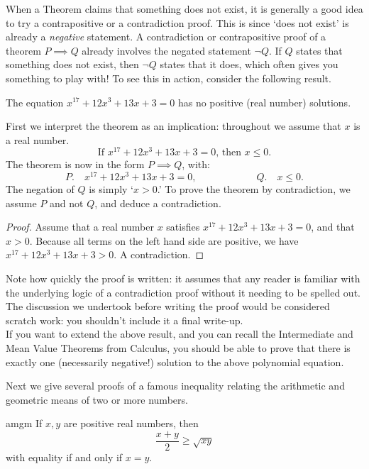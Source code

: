 
When a Theorem claims that something does not exist, it is generally a good idea to try a contrapositive or a contradiction proof. This is since `does not exist' is already a \emph{negative} statement. A contradiction or contrapositive proof of a theorem $P\implies Q$ already involves the negated statement $\neg Q$. If $Q$ states that something does not exist, then $\neg Q$ states that it does, which often gives you something to play with! To see this in action, consider the following result.

\begin{thm}{}{}
The equation $x^{17}+12x^3+13x+3=0$ has no positive (real number) solutions.
\end{thm}

 First we interpret the theorem as an implication: throughout we assume that $x$ is a real number.
\[\text{If $x^{17}+12x^3+13x+3=0$, then $x\leq 0$.}\]
The theorem is now in the form $P\implies Q$, with:
\[P.\quad x^{17}+12x^3+13x+3=0,\qquad\qquad\qquad Q.\quad x\le 0.\]
The negation of $Q$ is simply `$x>0$.' To prove the theorem by contradiction, we assume $P$ and not $Q$, and deduce a contradiction.

\begin{proof}
Assume that a real number $x$ satisfies $x^{17}+12x^3+13x+3=0$, and that $x>0$. Because all terms on the left hand side are positive, we have $x^{17}+12x^3+13x+3>0$. A contradiction.
\end{proof}


 Note how quickly the proof is written: it assumes that any reader is familiar with the underlying logic of a contradiction proof without it needing to be spelled out. The discussion we undertook before writing the proof would be considered scratch work: you shouldn't include it a final write-up.\\

 If you want to extend the above result, and you can recall the Intermediate and Mean Value Theorems from Calculus, you should be able to prove that there is exactly one (necessarily negative!) solution to the above polynomial equation.


Next we give several proofs of a famous inequality relating the arithmetic and geometric means of two or more numbers.

\begin{thm}{}{amgm}
If $x,y$ are positive real numbers, then
\[\frac{x+y}{2}\ge\sqrt{xy}\]
with equality if and only if $x=y$.
\end{thm}

